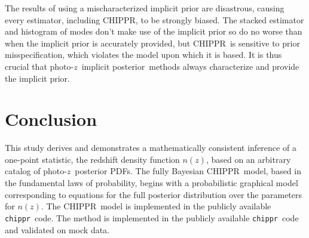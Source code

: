 \documentclass[iop]{emulateapj}
\newcommand{\todo}[3]{{\color{#2}\emph{#1}: #3}}
\newcommand{\que}[1]{\todo{Question}{cyan}{#1}}
\newcommand{\Sect}[1]{Section~\ref{#1}}
\newcommand{\Tab}[1]{Table~\ref{#1}}
\newcommand{\project}[1]{\textsc{#1}}
\newcommand{\Chippr}{\project{CHIPPR}}%
\newcommand{\repo}[1]{\texttt{#1}}
\newcommand{\chippr}{\repo{chippr}}
\newcommand{\pz}{photo-$z$}
\newcommand{\pzpdf}{\pz\ posterior PDF}%
\newcommand{\pzip}{\pz\ implicit posterior}
\newcommand{\nz}{$n(z)$}
\begin{document}
The results of using a mischaracterized implicit prior are disastrous, causing every estimator, including \Chippr, to be strongly biased.
The stacked estimator and histogram of modes don't make use of the implicit prior so do no worse than when the implicit prior is accurately provided, but \Chippr\ is sensitive to prior misspecification, which violates the model upon which it is based.
It is thus crucial that \pzip\ methods always characterize and provide the implicit prior.


\section{Conclusion}
\label{sec:con}


This study derives and demonstrates a mathematically consistent inference of a one-point statistic, the redshift density function \nz, based on an arbitrary catalog of \pzpdf s.  
The fully Bayesian \Chippr\ model, based in the fundamental laws of probability, begins with a probabilistic graphical model corresponding to equations for the full posterior distribution over the parameters for \nz.  
The \Chippr\ model is implemented in the publicly available \chippr\ code.
The method is implemented in the publicly available \chippr\ code and validated on mock data.

\end{document}
